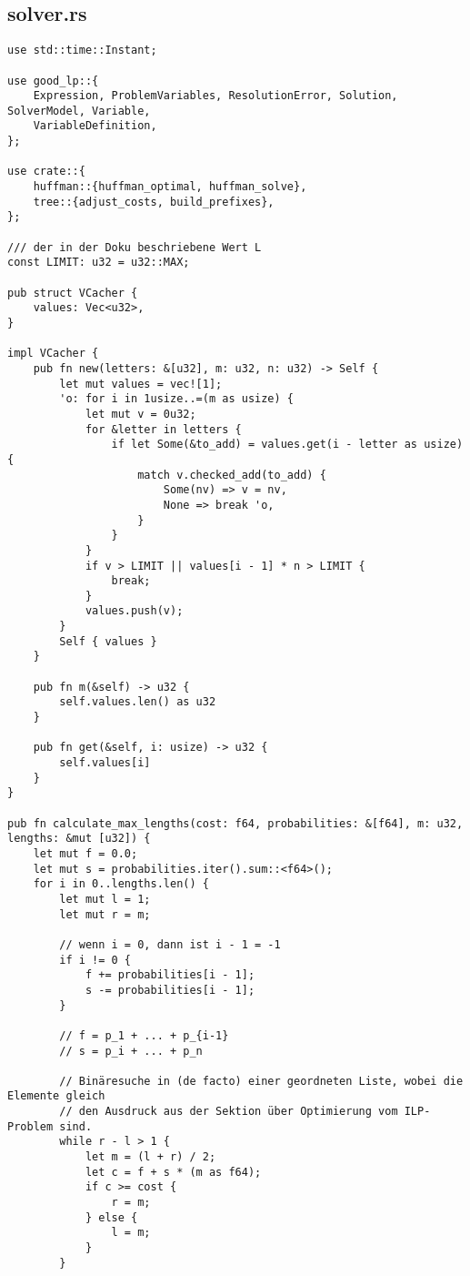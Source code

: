 \subsection{solver.rs}
\begin{lstlisting}
use std::time::Instant;

use good_lp::{
    Expression, ProblemVariables, ResolutionError, Solution, SolverModel, Variable,
    VariableDefinition,
};

use crate::{
    huffman::{huffman_optimal, huffman_solve},
    tree::{adjust_costs, build_prefixes},
};

/// der in der Doku beschriebene Wert L
const LIMIT: u32 = u32::MAX;

pub struct VCacher {
    values: Vec<u32>,
}

impl VCacher {
    pub fn new(letters: &[u32], m: u32, n: u32) -> Self {
        let mut values = vec![1];
        'o: for i in 1usize..=(m as usize) {
            let mut v = 0u32;
            for &letter in letters {
                if let Some(&to_add) = values.get(i - letter as usize) {
                    match v.checked_add(to_add) {
                        Some(nv) => v = nv,
                        None => break 'o,
                    }
                }
            }
            if v > LIMIT || values[i - 1] * n > LIMIT {
                break;
            }
            values.push(v);
        }
        Self { values }
    }

    pub fn m(&self) -> u32 {
        self.values.len() as u32
    }

    pub fn get(&self, i: usize) -> u32 {
        self.values[i]
    }
}

pub fn calculate_max_lengths(cost: f64, probabilities: &[f64], m: u32, lengths: &mut [u32]) {
    let mut f = 0.0;
    let mut s = probabilities.iter().sum::<f64>();
    for i in 0..lengths.len() {
        let mut l = 1;
        let mut r = m;

        // wenn i = 0, dann ist i - 1 = -1
        if i != 0 {
            f += probabilities[i - 1];
            s -= probabilities[i - 1];
        }
        
        // f = p_1 + ... + p_{i-1}
        // s = p_i + ... + p_n

        // Binäresuche in (de facto) einer geordneten Liste, wobei die Elemente gleich
        // den Ausdruck aus der Sektion über Optimierung vom ILP-Problem sind.
        while r - l > 1 {
            let m = (l + r) / 2;
            let c = f + s * (m as f64);
            if c >= cost {
                r = m;
            } else {
                l = m;
            }
        }


\end{lstlisting}
